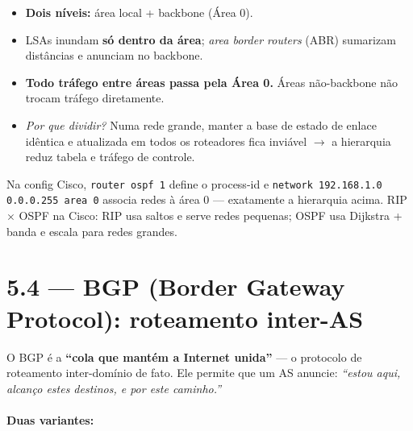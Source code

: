\documentclass[11pt,a4paper]{article}
\begin{document}
\begin{itemize}
    \item \textbf{Dois níveis:} área local + backbone (Área 0).
    \item LSAs inundam \textbf{só dentro da área}; \textit{area border routers} (ABR) sumarizam distâncias e anunciam no backbone.
    \item \textbf{Todo tráfego entre áreas passa pela Área 0.} Áreas não-backbone não trocam tráfego diretamente.
    \item \textit{Por que dividir?} Numa rede grande, manter a base de estado de enlace idêntica e atualizada em todos os roteadores fica inviável $\to$ a hierarquia reduz tabela e tráfego de controle.
\end{itemize}

\begin{pratico}
Na config Cisco, \texttt{router ospf 1} define o process-id e \texttt{network 192.168.1.0 0.0.0.255 area 0} associa redes à área 0 --- exatamente a hierarquia acima. RIP $\times$ OSPF na Cisco: RIP usa saltos e serve redes pequenas; OSPF usa Dijkstra + banda e escala para redes grandes.
\end{pratico}

\hrulefill

\section{5.4 --- BGP (Border Gateway Protocol): roteamento inter-AS}

O BGP é a \textbf{``cola que mantém a Internet unida''} --- o protocolo de roteamento inter-domínio de fato. Ele permite que um AS anuncie: \textit{``estou aqui, alcanço estes destinos, e por este caminho.''}

\paragraph{Duas variantes:}
\end{document}
